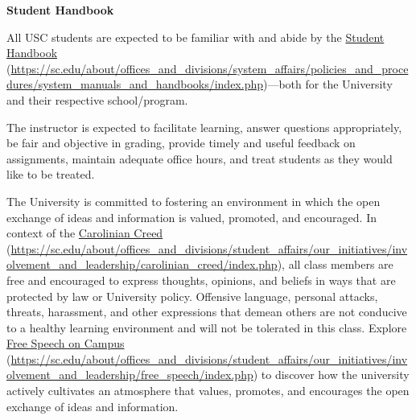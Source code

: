 \documentclass[11pt,letterpaper]{article}
\begin{document}
\newpage





{\bfseries Student Handbook} \par
All USC students are expected to be familiar with and abide by the \href{https://sc.edu/about/offices_and_divisions/system_affairs/policies_and_procedures/system_manuals_and_handbooks/index.php}{Student Handbook} (\url{https://sc.edu/about/offices_and_divisions/system_affairs/policies_and_procedures/system_manuals_and_handbooks/index.php})---both for the University and their respective school/program. \sectionbreak




The instructor is expected to facilitate learning, answer questions appropriately, be fair and objective in grading, provide timely and useful feedback on assignments, maintain adequate office hours, and treat students as they would like to be treated. \sectionbreak




The University is committed to fostering an environment in which the open exchange of ideas and information is valued, promoted, and encouraged.  In context of the \href{https://sc.edu/about/offices\_and\_divisions/student\_affairs/our\_initiatives/involvement\_and\_leadership/carolinian\_creed/index.php}{Carolinian Creed} (\url{https://sc.edu/about/offices\_and\_divisions/student\_affairs/our\_initiatives/involvement\_and\_leadership/carolinian\_creed/index.php}), all class members are free and encouraged to express thoughts, opinions, and beliefs in ways that are protected by law or University policy. Offensive language, personal attacks, threats, harassment, and other expressions that demean others are not conducive to a healthy learning environment and will not be tolerated in this class. Explore \href{https://sc.edu/about/offices\_and\_divisions/student\_affairs/our\_initiatives/involvement\_and\_leadership/free\_speech/index.php}{Free Speech on Campus} (\url{https://sc.edu/about/offices\_and\_divisions/student\_affairs/our\_initiatives/involvement\_and\_leadership/free\_speech/index.php}) to discover how the university actively cultivates an atmosphere that values, promotes, and encourages the open exchange of ideas and information. \sectionbreak
\end{document}
